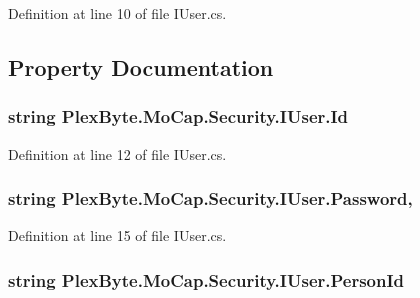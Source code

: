 Definition at line 10 of file I\+User.\+cs.



\subsection{Property Documentation}
\subsubsection[{\texorpdfstring{Id}{Id}}]{\setlength{\rightskip}{0pt plus 5cm}string Plex\+Byte.\+Mo\+Cap.\+Security.\+I\+User.\+Id\hspace{0.3cm}{\ttfamily [get]}}\hypertarget{interface_plex_byte_1_1_mo_cap_1_1_security_1_1_i_user_ab9deb17662dc2e4af4c794388fd1ef96}{}\label{interface_plex_byte_1_1_mo_cap_1_1_security_1_1_i_user_ab9deb17662dc2e4af4c794388fd1ef96}


Definition at line 12 of file I\+User.\+cs.

\subsubsection[{\texorpdfstring{Password}{Password}}]{\setlength{\rightskip}{0pt plus 5cm}string Plex\+Byte.\+Mo\+Cap.\+Security.\+I\+User.\+Password\hspace{0.3cm}{\ttfamily [get]}, {\ttfamily [set]}}\hypertarget{interface_plex_byte_1_1_mo_cap_1_1_security_1_1_i_user_aa2130f9b3edc6b7f08f40787486c841f}{}\label{interface_plex_byte_1_1_mo_cap_1_1_security_1_1_i_user_aa2130f9b3edc6b7f08f40787486c841f}


Definition at line 15 of file I\+User.\+cs.

\subsubsection[{\texorpdfstring{Person\+Id}{PersonId}}]{\setlength{\rightskip}{0pt plus 5cm}string Plex\+Byte.\+Mo\+Cap.\+Security.\+I\+User.\+Person\+Id\hspace{0.3cm}{\ttfamily [get]}}\hypertarget{interface_plex_byte_1_1_mo_cap_1_1_security_1_1_i_user_a626a3fa1b5447931df4a99b12236d4d0}{}\label{interface_plex_byte_1_1_mo_cap_1_1_security_1_1_i_user_a626a3fa1b5447931df4a99b12236d4d0}


